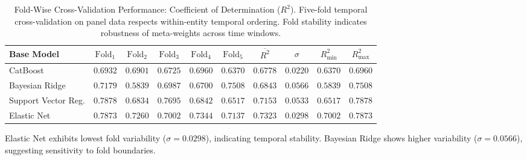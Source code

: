 \begin{table}[!htbp]
\centering
\caption{%
    Fold-Wise Cross-Validation Performance: Coefficient of Determination ($R^2$).
    Five-fold temporal cross-validation on panel data respects within-entity temporal ordering.
    Fold stability indicates robustness of meta-weights across time windows.
}
\label{tab:cv_stability}
\small
\begin{tabular}{lccccccccc}
\toprule
\textbf{Base Model} & $\text{Fold}_1$ & $\text{Fold}_2$ & $\text{Fold}_3$ & $\text{Fold}_4$ & $\text{Fold}_5$ 
                  & $\overline{R^2}$ & $\sigma$ & $R^2_{\min}$ & $R^2_{\max}$ \\
\midrule
CatBoost           & $0.6932$ & $0.6901$ & $0.6725$ & $0.6960$ & $0.6370$ & $0.6778$ & $0.0220$ & $0.6370$ & $0.6960$ \\
Bayesian Ridge     & $0.7179$ & $0.5839$ & $0.6987$ & $0.6700$ & $0.7508$ & $0.6843$ & $0.0566$ & $0.5839$ & $0.7508$ \\
Support Vector Reg.& $0.7878$ & $0.6834$ & $0.7695$ & $0.6842$ & $0.6517$ & $0.7153$ & $0.0533$ & $0.6517$ & $0.7878$ \\
Elastic Net        & $0.7873$ & $0.7260$ & $0.7002$ & $0.7344$ & $0.7137$ & $0.7323$ & $0.0298$ & $0.7002$ & $0.7873$ \\
\bottomrule
\end{tabular}
\begin{flushleft}
\footnotesize
Elastic Net exhibits lowest fold variability ($\sigma = 0.0298$), indicating temporal stability.
Bayesian Ridge shows higher variability ($\sigma = 0.0566$), suggesting sensitivity to fold boundaries.
\end{flushleft}
\end{table}


